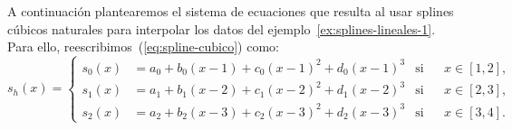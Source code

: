    \begin{example}
      \label{ex:splines-cubicos}
      A continuación plantearemos el sistema de ecuaciones que resulta al
      usar splines cúbicos naturales para
      interpolar los datos del ejemplo~\ref{ex:splines-lineales-1}. Para
      ello, reescribimos~(\ref{eq:spline-cubico}) como:
      \begin{equation*}
        s_h(x)=\left\{
          \begin{aligned}
            s_0(x)&=a_0 + b_0(x-1) + c_0(x-1)^2 + d_0(x-1)^3 
            & \text{si} && x\in[1,2],
            \\
            s_1(x)&=a_1 + b_1(x-2) + c_1(x-2)^2 + d_1(x-2)^3 
            &\text{si}&& x\in[2,3],
            \\
            s_2(x)&=a_2 + b_2(x-3) + c_2(x-3)^2 + d_2(x-3)^3 
            & \text{si}&& x\in[3,4].
          \end{aligned}\right.
      \end{equation*}
    \end{example}

